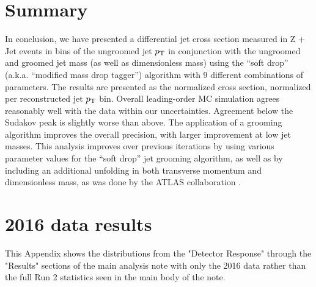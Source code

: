 

\section{Summary}

In conclusion, we have presented a differential jet cross section measured in Z + Jet events in
bins of the ungroomed jet $p_{\mathrm{T}}$ in conjunction with the ungroomed and groomed
jet mass (as well as dimensionless mass) using the ``soft drop'' (a.k.a. ``modified mass drop
tagger'') algorithm with 9 different combinations of parameters. 
The results are presented as the normalized cross section, normalized per reconstructed jet $p_{\mathrm{T}}$ bin. 
Overall leading-order MC simulation agrees
reasonably well with the data within our uncertainties. 
Agreement below the Sudakov peak is slightly
worse than above. The application of a grooming algorithm
improves the overall precision, with larger improvement at low jet masses. 
This analysis improves over previous iterations by using various parameter values for the ``soft drop''
jet grooming algorithm, as well as by including an additional unfolding in both transverse momentum
and dimensionless mass, as was done by the ATLAS collaboration \cite{Aaboud:2017qwh} .





\appendix

\section{2016 data results}

This Appendix shows the distributions from the "Detector Response" through the "Results" sections of the main analysis note with only the 2016 data rather than the full Run 2 statistics seen in the main body of the note.









%


%









